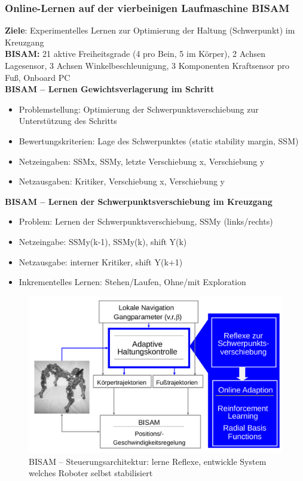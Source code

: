 \subsubsection{Online-Lernen auf der vierbeinigen Laufmaschine BISAM}
\textbf{Ziele}:
Experimentelles Lernen zur Optimierung der Haltung (Schwerpunkt) im Kreuzgang\\
\textbf{BISAM:}
21 aktive Freiheitsgrade (4 pro Bein, 5 im Körper), 2 Achsen Lagesensor, 3 Achsen Winkelbeschleunigung, 3 Komponenten Kraftsensor pro Fuß, Onboard PC\\
%
\textbf{BISAM -- Lernen Gewichtsverlagerung im Schritt}
\begin{itemize}
	\item Problemstellung: Optimierung der Schwerpunktsverschiebung zur Unterstützung des Schritts
	\item Bewertungskriterien: Lage des Schwerpunktes (static stability margin, SSM)
	\item Netzeingaben: SSMx, SSMy, letzte Verschiebung x, Verschiebung y
	\item Netzausgaben: Kritiker, Verschiebung x, Verschiebung y
\end{itemize}
\textbf{BISAM -- Lernen der Schwerpunktsverschiebung im Kreuzgang}
\begin{itemize}
	\item Problem: Lernen der Schwerpunktsverschiebung, SSMy (links/rechts)
	\item Netzeingabe: SSMy(k-1), SSMy(k), shift Y(k)
	\item Netzausgabe: interner Kritiker, shift Y(k+1)
	\item Inkrementelles Lernen: Stehen/Laufen, Ohne/mit Exploration
\end{itemize}

\begin{figure}
	\centering
	\includegraphics[width=.7\textwidth]{figures/bisam_steuerungsarchitektur.png}
	\caption{BISAM -- Steuerungsarchitektur: lerne Reflexe, entwickle System welches Roboter selbst stabilisiert}
\end{figure}

